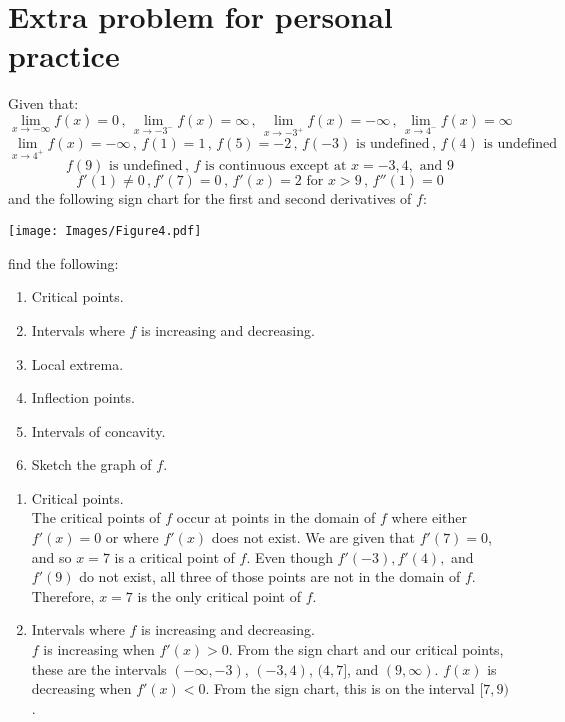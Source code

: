 \documentclass[nooutcomes]{ximera}
\renewenvironment{freeResponse}{
\ifhandout\setbox0\vbox\bgroup\else
\begin{trivlist}\item[\hskip \labelsep\bfseries Solution:\hspace{2ex}]
\fi}
{\ifhandout\egroup\else
\end{trivlist}
\fi}
\begin{document}
\section{Extra problem for personal practice}
\begin{problem}
  Given that:
  \[
    \lim_{x \to - \infty} f(x) = 0 \, , \, \lim_{x \to -3^-} f(x) = \infty \, , \, \lim_{x \to -3^+} f(x) = - \infty \, , \, \lim_{x \to 4^-} f(x) = \infty
  \]
  \[ 
  \lim_{x \to 4^+} f(x) = -\infty \, , \, f(1) = 1 \, , \, f(5) = -2 \, , \, f(-3) \text{ is undefined} \, , \, f(4) \text{ is undefined}
  \]
  \[
  f(9) \text{ is undefined} \, , \, f \text{ is continuous except at } x=-3, 4, \text{ and } 9 
  \]
  \[
    f'(1) \ne 0\, ,f'(7) = 0 \, , \, f'(x) = 2 \text{ for } x > 9 \, , \, f''(1) = 0
  \]
  and the following sign chart for the first and second derivatives of $f$:
  \begin{image}
    \texttt{[image: Images/Figure4.pdf]}
  \end{image}
	
find the following:
  \begin{enumerate}
     \item  Critical points.
     \item  Intervals where $f$ is increasing and decreasing.
     \item  Local extrema.
     \item  Inflection points.
     \item  Intervals of concavity.
     \item  Sketch the graph of $f$.
	
  \end{enumerate}
  \begin{freeResponse}
    \begin{enumerate}
      \item
        Critical points. \\
	The critical points of $f$ occur at points in the domain of $f$ where either $f'(x)=0$ or where $f'(x)$ does not exist.
        We are given that $f'(7)=0$, and so $x=7$ is a critical point of $f$.
        Even though $f'(-3), f'(4),$ and $f'(9)$ do not exist, all three of those points are not in the domain of $f$.
        Therefore, $x=7$ is the only critical point of $f$.  
			
      \item
        Intervals where $f$ is increasing and decreasing.  \\
        $f$ is increasing when $f'(x)>0$.
        From the sign chart and our critical points, these are the intervals $(-\infty ,-3)$, $(-3,4)$, $(4,7]$, and $(9,\infty )$.
        $f(x)$ is decreasing when $f'(x)<0$.
        From the sign chart, this is on the interval $[7,9)$.
			

\end{enumerate}
\end{freeResponse}
\end{problem}
\end{document}
